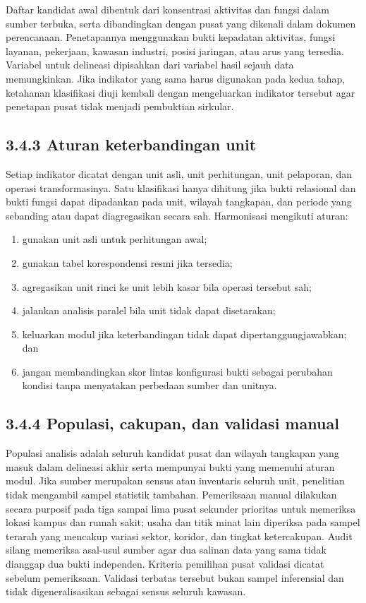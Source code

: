 \documentclass[
  indonesian,
  11pt,
  a4paper,
  oneside,
  openany]{report}
\providecommand{\tightlist}{%
  \setlength{\itemsep}{0pt}\setlength{\parskip}{0pt}}
\begin{document}
Daftar kandidat awal dibentuk dari konsentrasi aktivitas dan fungsi
dalam sumber terbuka, serta dibandingkan dengan pusat yang dikenali
dalam dokumen perencanaan. Penetapannya menggunakan bukti kepadatan
aktivitas, fungsi layanan, pekerjaan, kawasan industri, posisi jaringan,
atau arus yang tersedia. Variabel untuk delineasi dipisahkan dari
variabel hasil sejauh data memungkinkan. Jika indikator yang sama harus
digunakan pada kedua tahap, ketahanan klasifikasi diuji kembali dengan
mengeluarkan indikator tersebut agar penetapan pusat tidak menjadi
pembuktian sirkular.

\subsection{3.4.3 Aturan keterbandingan
unit}\label{aturan-keterbandingan-unit}

Setiap indikator dicatat dengan unit asli, unit perhitungan, unit
pelaporan, dan operasi transformasinya. Satu klasifikasi hanya dihitung
jika bukti relasional dan bukti fungsi dapat dipadankan pada unit,
wilayah tangkapan, dan periode yang sebanding atau dapat diagregasikan
secara sah. Harmonisasi mengikuti aturan:

\begin{enumerate}
\def\labelenumi{\arabic{enumi}.}
\tightlist
\item
  gunakan unit asli untuk perhitungan awal;
\item
  gunakan tabel korespondensi resmi jika tersedia;
\item
  agregasikan unit rinci ke unit lebih kasar bila operasi tersebut sah;
\item
  jalankan analisis paralel bila unit tidak dapat disetarakan;
\item
  keluarkan modul jika keterbandingan tidak dapat dipertanggungjawabkan;
  dan
\item
  jangan membandingkan skor lintas konfigurasi bukti sebagai perubahan
  kondisi tanpa menyatakan perbedaan sumber dan unitnya.
\end{enumerate}

\subsection{3.4.4 Populasi, cakupan, dan validasi
manual}\label{populasi-cakupan-dan-validasi-manual}

Populasi analisis adalah seluruh kandidat pusat dan wilayah tangkapan
yang masuk dalam delineasi akhir serta mempunyai bukti yang memenuhi
aturan modul. Jika sumber merupakan sensus atau inventaris seluruh unit,
penelitian tidak mengambil sampel statistik tambahan. Pemeriksaan manual
dilakukan secara purposif pada tiga sampai lima pusat sekunder prioritas
untuk memeriksa lokasi kampus dan rumah sakit; usaha dan titik minat
lain diperiksa pada sampel terarah yang mencakup variasi sektor,
koridor, dan tingkat ketercakupan. Audit silang memeriksa asal-usul
sumber agar dua salinan data yang sama tidak dianggap dua bukti
independen. Kriteria pemilihan pusat validasi dicatat sebelum
pemeriksaan. Validasi terbatas tersebut bukan sampel inferensial dan
tidak digeneralisasikan sebagai sensus seluruh kawasan.
\end{document}
